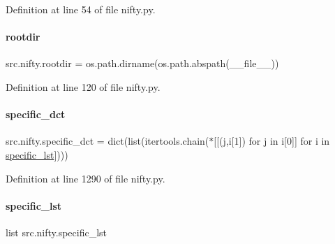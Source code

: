 Definition at line 54 of file nifty.\+py.

\mbox{\label{namespacesrc_1_1nifty_a95a677429c7a93940e9d1ac85a8896a8}} 
\paragraph{\texorpdfstring{rootdir}{rootdir}}
{\footnotesize\ttfamily src.\+nifty.\+rootdir = os.\+path.\+dirname(os.\+path.\+abspath(\+\_\+\+\_\+file\+\_\+\+\_\+))}



Definition at line 120 of file nifty.\+py.

\mbox{\label{namespacesrc_1_1nifty_acf4022cbb593c9dff0a1305d52d02c06}} 
\paragraph{\texorpdfstring{specific\+\_\+dct}{specific\_dct}}
{\footnotesize\ttfamily src.\+nifty.\+specific\+\_\+dct = dict(list(itertools.\+chain($\ast$\mbox{[}\mbox{[}(j,i\mbox{[}1\mbox{]}) for j in i\mbox{[}0\mbox{]}\mbox{]} for i in \hyperlink{namespacesrc_1_1nifty_a85e464a26ad72d93b9560c9e7fb5b949}{specific\+\_\+lst}\mbox{]})))}



Definition at line 1290 of file nifty.\+py.

\mbox{\label{namespacesrc_1_1nifty_a85e464a26ad72d93b9560c9e7fb5b949}} 
\paragraph{\texorpdfstring{specific\+\_\+lst}{specific\_lst}}
{\footnotesize\ttfamily list src.\+nifty.\+specific\+\_\+lst}


